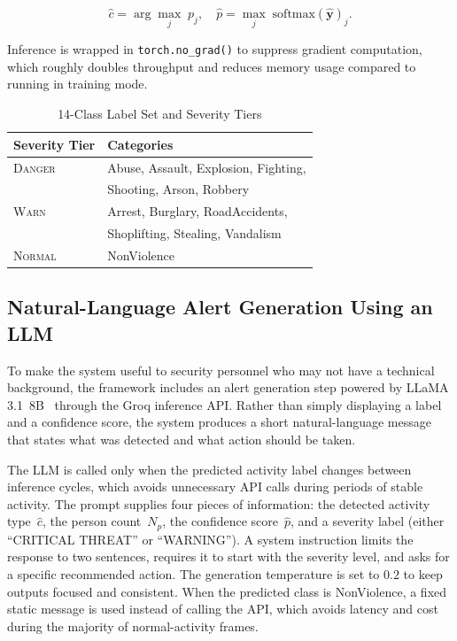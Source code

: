 \documentclass[conference]{IEEEtran}
\begin{document}
\begin{equation}
\hat{c} = \arg\max_j\; p_j, \quad
\hat{p} = \max_j\; \text{softmax}(\hat{\mathbf{y}})_j.
\end{equation}

Inference is wrapped in \texttt{torch.no\_grad()} to suppress gradient
computation, which roughly doubles throughput and reduces memory usage
compared to running in training mode.

\begin{table}[htbp]
\caption{14-Class Label Set and Severity Tiers}
\label{tab:labels}
\centering
\renewcommand{\arraystretch}{1.2}
\begin{tabular}{|l|l|}
\hline
\textbf{Severity Tier} & \textbf{Categories} \\
\hline
\textsc{Danger} & Abuse, Assault, Explosion, Fighting, \\
                & Shooting, Arson, Robbery \\
\hline
\textsc{Warn}   & Arrest, Burglary, RoadAccidents, \\
                & Shoplifting, Stealing, Vandalism \\
\hline
\textsc{Normal} & NonViolence \\
\hline
\end{tabular}
\end{table}

\subsection{Natural-Language Alert Generation Using an LLM}

To make the system useful to security personnel who may not have a
technical background, the framework includes an alert generation step
powered by LLaMA 3.1~8B~\cite{meta2024} through the Groq inference API.
Rather than simply displaying a label and a confidence score, the system
produces a short natural-language message that states what was detected
and what action should be taken.

The LLM is called only when the predicted activity label changes between
inference cycles, which avoids unnecessary API calls during periods of
stable activity. The prompt supplies four pieces of information: the
detected activity type~$\hat{c}$, the person count~$N_p$, the confidence
score~$\hat{p}$, and a severity label (either ``CRITICAL THREAT'' or
``WARNING''). A system instruction limits the response to two sentences,
requires it to start with the severity level, and asks for a specific
recommended action. The generation temperature is set to $0.2$ to keep
outputs focused and consistent. When the predicted class is NonViolence,
a fixed static message is used instead of calling the API, which avoids
latency and cost during the majority of normal-activity frames.
\end{document}
